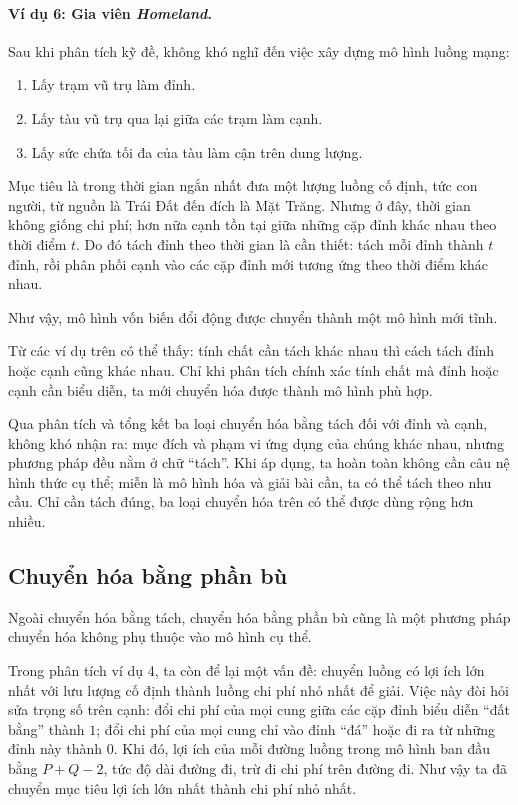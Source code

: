 \documentclass[11pt]{article}
\begin{document}
\paragraph{Ví dụ 6: Gia viên \textit{Homeland}.}
Sau khi phân tích kỹ đề, không khó nghĩ đến việc xây dựng mô hình luồng mạng:
\begin{enumerate}
  \item Lấy trạm vũ trụ làm đỉnh.
  \item Lấy tàu vũ trụ qua lại giữa các trạm làm cạnh.
  \item Lấy sức chứa tối đa của tàu làm cận trên dung lượng.
\end{enumerate}
Mục tiêu là trong thời gian ngắn nhất đưa một lượng luồng cố định, tức con
người, từ nguồn là Trái Đất đến đích là Mặt Trăng. Nhưng ở đây, thời gian
không giống chi phí; hơn nữa cạnh tồn tại giữa những cặp đỉnh khác nhau theo
thời điểm \(t\). Do đó tách đỉnh theo thời gian là cần thiết: tách mỗi đỉnh
thành \(t\) đỉnh, rồi phân phối cạnh vào các cặp đỉnh mới tương ứng theo thời
điểm khác nhau.

Như vậy, mô hình vốn biến đổi động được chuyển thành một mô hình mới tĩnh.

Từ các ví dụ trên có thể thấy: tính chất cần tách khác nhau thì cách tách
đỉnh hoặc cạnh cũng khác nhau. Chỉ khi phân tích chính xác tính chất mà đỉnh
hoặc cạnh cần biểu diễn, ta mới chuyển hóa được thành mô hình phù hợp.

Qua phân tích và tổng kết ba loại chuyển hóa bằng tách đối với đỉnh và cạnh,
không khó nhận ra: mục đích và phạm vi ứng dụng của chúng khác nhau, nhưng
phương pháp đều nằm ở chữ ``tách''. Khi áp dụng, ta hoàn toàn không cần câu
nệ hình thức cụ thể; miễn là mô hình hóa và giải bài cần, ta có thể tách theo
nhu cầu. Chỉ cần tách đúng, ba loại chuyển hóa trên có thể được dùng rộng hơn
nhiều.

\subsection{Chuyển hóa bằng phần bù}

Ngoài chuyển hóa bằng tách, chuyển hóa bằng phần bù cũng là một phương pháp
chuyển hóa không phụ thuộc vào mô hình cụ thể.

Trong phân tích ví dụ 4, ta còn để lại một vấn đề: chuyển luồng có lợi ích
lớn nhất với lưu lượng cố định thành luồng chi phí nhỏ nhất để giải. Việc này
đòi hỏi sửa trọng số trên cạnh: đổi chi phí của mọi cung giữa các cặp đỉnh
biểu diễn ``đất bằng'' thành \(1\); đổi chi phí của mọi cung chỉ vào đỉnh
``đá'' hoặc đi ra từ những đỉnh này thành \(0\). Khi đó, lợi ích của mỗi
đường luồng trong mô hình ban đầu bằng \(P+Q-2\), tức độ dài đường đi, trừ đi chi
phí trên đường đi. Như vậy ta đã chuyển mục tiêu lợi ích lớn nhất thành chi
phí nhỏ nhất.
\end{document}
